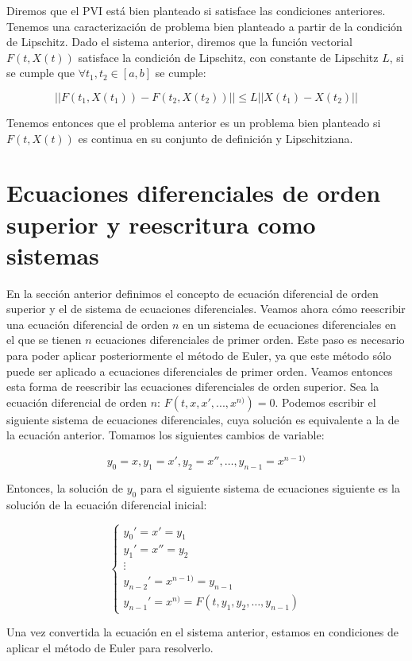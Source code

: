 \documentclass[12pt]{article}       %
\begin{document}
Diremos que el PVI está bien planteado si satisface las condiciones anteriores. Tenemos una caracterización de problema bien planteado a partir de la condición de Lipschitz. Dado el sistema anterior, diremos que la función vectorial $F(t, X(t))$ satisface la condición de Lipschitz, con constante de Lipschitz $L$, si se cumple que $\forall t_1, t_2 \in [a,b]$ se cumple:

$$ ||F(t_1, X(t_1)) - F(t_2, X(t_2))|| \leq L||X(t_1) - X(t_2)||$$

Tenemos entonces que el problema anterior es un problema bien planteado si $F(t, X(t))$ es continua en su conjunto de definición y Lipschitziana.

\section{Ecuaciones diferenciales de orden superior y reescritura como sistemas}

En la sección anterior definimos el concepto de ecuación diferencial de orden superior y el de sistema de ecuaciones diferenciales. Veamos ahora cómo reescribir una ecuación diferencial de orden $n$ en un sistema de ecuaciones diferenciales en el que se tienen $n$ ecuaciones diferenciales de primer orden. Este paso es necesario para poder aplicar posteriormente el método de Euler, ya que este método sólo puede ser aplicado a ecuaciones diferenciales de primer orden. Veamos entonces esta forma de reescribir las ecuaciones diferenciales de orden superior. Sea la ecuación diferencial de orden $n$: $ F(t, x, x', ..., x^{n)}) = 0 $. Podemos escribir el siguiente sistema de ecuaciones diferenciales, cuya solución es equivalente a la de la ecuación anterior. Tomamos los siguientes cambios de variable:

$$y_0 = x, y_1 = x', y_2 = x'', \dots, y_{n-1} = x^{n-1)}$$

Entonces, la solución de $y_0$ para el siguiente sistema de ecuaciones siguiente es la solución de la ecuación diferencial inicial:

$$
\begin{cases}
y_0' = x' = y_1\\
y_1' = x'' = y_2\\
\vdots\\
y_{n-2}' = x^{n-1)} = y_{n-1}\\
y_{n-1}' = x^{n)} = F(t, y_1, y_2, \dots, y_{n-1})
\end{cases}
$$

Una vez convertida la ecuación en el sistema anterior, estamos en condiciones de aplicar el método de Euler para resolverlo.
\end{document}
